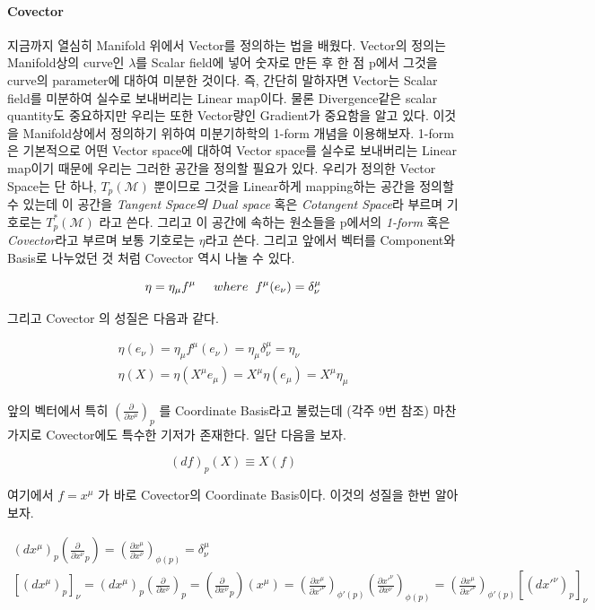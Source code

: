 \documentclass[final]{IEEEphot} %
\numberwithin{equation}{section} %
\numberwithin{figure}{section} %
\numberwithin{table}{section} %
\theoremstyle{plain}
\newcommand{\HS}{\hspace{0.5cm}}
\newcommand{\PD}[2]{\frac{\partial #1}{\partial #2}}
\newcommand{\BKS}[1]{\left( #1 \right)}
\newcommand{\Tangent}{T_p (\Manifold)}
\newcommand{\Cotangent}{T^{*}_p (\Manifold)}
\newcommand{\Manifold}{\mathcal{M}}
\newcommand{\Basis}[1][\mu]{\BKS{\PD{}{x^{#1}}}_p}
\begin{document}
\paragraph{Covector} 지금까지 열심히 Manifold 위에서 Vector를 정의하는 법을 배웠다. Vector의 정의는 Manifold상의 curve인 $\lambda$를 Scalar field에 넣어 숫자로 만든 후 한 점 p에서 
그것을 curve의 parameter에 대하여 미분한 것이다. 즉, 간단히 말하자면 Vector는 Scalar field를 미분하여 실수로 보내버리는 Linear map이다. 물론 Divergence같은 scalar quantity도 중요하지만
우리는 또한 Vector량인 Gradient가 중요함을 알고 있다. 이것을 Manifold상에서 정의하기 위하여 미분기하학의 1-form 개념을 이용해보자. 1-form은 기본적으로 어떤 Vector space에 대하여
Vector space를 실수로 보내버리는 Linear map이기 때문에 우리는 그러한 공간을 정의할 필요가 있다. 우리가 정의한 Vector Space는 단 하나, $\Tangent$ 뿐이므로 그것을 Linear하게 mapping하는
공간을 정의할 수 있는데 이 공간을 \emph{Tangent Space의 Dual space} 혹은 \emph{Cotangent Space}라 부르며 기호로는 $\Cotangent$ 라고 쓴다. 
그리고 이 공간에 속하는 원소들을 p에서의 \emph{1-form} 혹은 \emph{Covector}라고 부르며 보통 기호로는 $\eta$라고 쓴다. 그리고 앞에서 벡터를 Component와 Basis로 나누었던 것 처럼 
Covector 역시 나눌 수 있다.

\begin{equation*}
 \eta = \eta_{\mu} f^{\mu} \HS where \hspace{0.2cm} f^{\mu} (e_{\nu}) = \delta^{\mu}_{\nu}
\end{equation*}

그리고 Covector 의 성질은 다음과 같다.

\begin{gather*}
 \eta(e_{\nu}) = \eta_{\mu} f^{\mu}(e_{\nu}) = \eta_{\mu} \delta^{\mu}_{\nu} = \eta_{\nu} \\
 \eta(X) = \eta(X^{\mu} e_{\mu}) = X^{\mu} \eta (e_{\mu}) = X^{\mu} \eta_{\mu}
\end{gather*}

앞의 벡터에서 특히 $\Basis$ 를 Coordinate Basis라고 불렀는데 (각주 9번 참조) 마찬가지로 Covector에도 특수한 기저가 존재한다. 일단 다음을 보자.

\begin{equation}
\label{eq:CC}
 (df)_p (X) \equiv X(f)
\end{equation}

여기에서 $f=x^{\mu}$ 가 바로 Covector의 Coordinate Basis이다. 이것의 성질을 한번 알아보자.

\begin{gather}
\label{eq:dual}
 (dx^{\mu})_p \BKS{\PD{}{x^{\nu}}_p} = \BKS{\PD{x^{\mu}}{x^{\nu}}}_{\phi(p)} = \delta^{\mu}_{\nu} \\
 \left[ (dx^{\mu})_p \right] _{\nu} = (dx^{\mu})_p \BKS{\PD{}{x^{\nu}}}_p = \BKS{ \PD{}{x^{\nu}}_p } \BKS{x^{\mu}} = \BKS{\PD{x^{\mu}}{x'^{\nu}}}_{\phi'(p)} \BKS{\PD{x'^{\nu}}{x^{\nu}}}_{\phi(p)}
 = \BKS{\PD{x^{\mu}}{x'^{\nu}}}_{\phi'(p)} \left[ (dx'^{\nu})_p \right]_{\nu}
 \label{eq:covector}
\end{gather}
\end{document}
